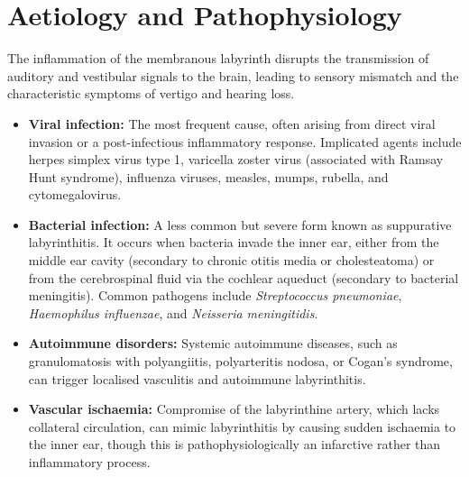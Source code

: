 \section*{Aetiology and Pathophysiology}
The inflammation of the membranous labyrinth disrupts the transmission of auditory and vestibular signals to the brain, leading to sensory mismatch and the characteristic symptoms of vertigo and hearing loss.
\begin{itemize}
    \item \textbf{Viral infection:} The most frequent cause, often arising from direct viral invasion or a post-infectious inflammatory response. Implicated agents include herpes simplex virus type 1, varicella zoster virus (associated with Ramsay Hunt syndrome), influenza viruses, measles, mumps, rubella, and cytomegalovirus.
    \item \textbf{Bacterial infection:} A less common but severe form known as suppurative labyrinthitis. It occurs when bacteria invade the inner ear, either from the middle ear cavity (secondary to chronic otitis media or cholesteatoma) or from the cerebrospinal fluid via the cochlear aqueduct (secondary to bacterial meningitis). Common pathogens include \textit{Streptococcus pneumoniae}, \textit{Haemophilus influenzae}, and \textit{Neisseria meningitidis}.
    \item \textbf{Autoimmune disorders:} Systemic autoimmune diseases, such as granulomatosis with polyangiitis, polyarteritis nodosa, or Cogan's syndrome, can trigger localised vasculitis and autoimmune labyrinthitis.
    \item \textbf{Vascular ischaemia:} Compromise of the labyrinthine artery, which lacks collateral circulation, can mimic labyrinthitis by causing sudden ischaemia to the inner ear, though this is pathophysiologically an infarctive rather than inflammatory process.
\end{itemize}

